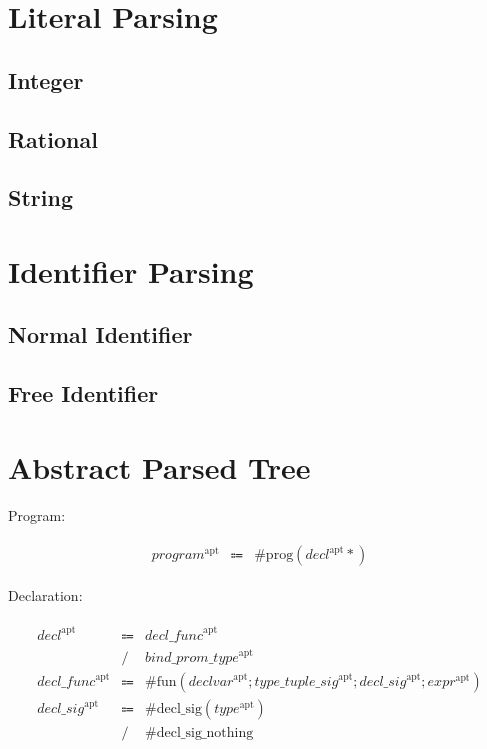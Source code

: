 \section{Literal Parsing}

\subsection{Integer}

\subsection{Rational}

\subsection{String}

\section{Identifier Parsing}

\subsection{Normal Identifier}

\subsection{Free Identifier}

\section{Abstract Parsed Tree}

Program:

\begin{align*}
    \begin{array}{rcll}
        \mathit{program}^\mathrm{apt}
        &\Coloneq &\mathrm{\#prog}(\mathit{decl}^\mathrm{apt}*)
    \end{array}
\end{align*}

Declaration:

\begin{align*}
    \begin{array}{rcll}
        \mathit{decl}^\mathrm{apt}
        &\Coloneq &\mathit{decl\_func}^\mathrm{apt} \\
        &\mathrel{/} &\mathit{bind\_prom\_type}^\mathrm{apt} \\
        \mathit{decl\_func}^\mathrm{apt}
        &\Coloneq &\mathrm{\#fun}(\mathit{declvar}^\mathrm{apt}; \mathit{type\_tuple\_sig}^\mathrm{apt}; \mathit{decl\_sig}^\mathrm{apt}; \mathit{expr}^\mathrm{apt}) \\
        \mathit{decl\_sig}^\mathrm{apt}
        &\Coloneq &\mathrm{\#decl\_sig}(\mathit{type}^\mathrm{apt}) \\
        &\mathrel{/} &\mathrm{\#decl\_sig\_nothing}
    \end{array}
\end{align*}

